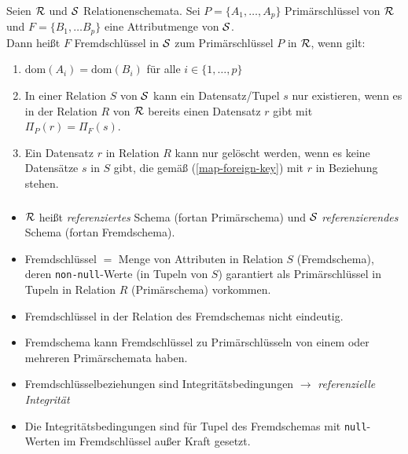 \begin{frame}\frametitle{\insertsection}
\framesubtitle{\insertsubsection}
\onslide
\begin{definition}[Fremdschlüssel] 
Seien $\mathcal{R}$ und $\mathcal{S}$ Relationenschemata. 
\nl
Sei $P=\{A_1,\ldots, A_p\}$ Prim\"arschl\"ussel von $\mathcal{R}$ 
und $F=\{B_1,\ldots B_p\}$ eine Attributmenge von $\mathcal{S}$. 
\\[8pt]
Dann hei\ss t $F$ Fremdschl\"ussel in $\mathcal{S}$ zum Prim\"arschl\"ussel $P$ in $\mathcal{R}$, wenn gilt:
\begin{enumerate}
	\pause
	\item $\text{dom}(A_i) = \text{dom}(B_i)$ f\"ur alle $i\in\{1,\ldots,p\}$
	\pause
	\item\label{map-foreign-key} In einer Relation $S$ von $\mathcal{S}$ kann ein Datensatz/Tupel $s$ nur existieren, wenn es in der 
	Relation $R$ von $\mathcal{R}$ bereits einen Datensatz $r$ gibt mit $\Pi_P(r)=\Pi_F(s)$.
	\pause
	\item 
	Ein Datensatz $r$ in Relation $R$ kann nur gel\"oscht werden, wenn es keine Datensätze $s$ in $S$ gibt,
	die {gem\"a\ss} (\ref{map-foreign-key}) mit $r$ in Beziehung stehen.
\end{enumerate}
\end{definition}
\end{frame} 

\begin{frame} 
\frametitle{\insertsection}
\framesubtitle{\insertsubsection}
\begin{itemize}
	\onslide
	\item $\mathcal{R}$ hei\ss t \emph{referenziertes} Schema (fortan Prim\"arschema) und $\mathcal{S}$ \emph{referenzierendes} Schema 
	(fortan Fremdschema).\\[4pt]
	\pause 
	\item Fremdschl\"ussel $=$ Menge von Attributen in Relation $S$ (Fremdschema), deren \texttt{non-null}-Werte 
	(in Tupeln von $S$) garantiert als Prim\"arschl\"ussel in Tupeln in Relation $R$ (Prim\"arschema) vorkommen.\\[4pt]
	\pause 
	\item Fremdschl\"ussel in der Relation des Fremdschemas nicht eindeutig.\\[4pt]
	\pause 
	\item Fremdschema kann Fremdschl\"ussel zu Prim\"arschl\"usseln von einem oder mehreren Prim\"arschemata haben.\\[4pt]
	\pause 
	\item Fremdschl\"usselbeziehungen sind Integrit\"atsbedingungen $\rightarrow$ \emph{referenzielle Integrit\"at}\\[4pt] 
	\pause 
	\item Die Integrit\"atsbedingungen sind f\"ur Tupel des Fremdschemas mit \texttt{null}-Werten im Fremdschl\"ussel 
	au\ss er Kraft gesetzt.
\end{itemize}
\end{frame}

